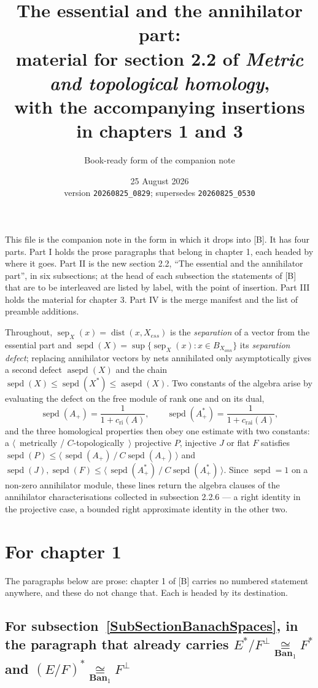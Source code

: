 \documentclass[11pt]{article}
\title{The essential and the annihilator part:\\
material for section 2.2 of \emph{Metric and topological homology},\\
with the accompanying insertions in chapters 1 and 3}
\author{Book-ready form of the companion note}
\date{25 August 2026 \\[2pt] {\small version \texttt{20260825\_0829};
supersedes \texttt{20260825\_0530}}}
\theoremstyle{plain}
\theoremstyle{definition}
\newcommand{\isom}[1]{\mathrel{\mathop{\cong}\limits_{#1}}}
\DeclareMathOperator{\dist}{dist}
\DeclareMathOperator{\sep}{sep}
\DeclareMathOperator{\sepd}{sepd}
\DeclareMathOperator{\asepd}{asepd}
\newcommand{\cri}{c_{\mathrm{ri}}}
\newcommand{\crai}{c_{\mathrm{rai}}}
\begin{document}
\maketitle

\noindent
This file is the companion note in the form in which it drops into [B]. It has
four parts. Part I holds the prose paragraphs that belong in chapter 1, each
headed by where it goes. Part II is the new section 2.2, ``The essential and the
annihilator part'', in six subsections; at the head of each subsection the
statements of [B] that are to be interleaved are listed by label, with the point
of insertion. Part III holds the material for chapter 3. Part IV is the merge
manifest and the list of preamble additions.

Throughout, $\sep_X(x)=\dist(x,X_{ess})$ is the \emph{separation} of a vector
from the essential part and
$\sepd(X)=\sup\{\sep_X(x):x\in B_{X_{ann}}\}$ its \emph{separation defect};
replacing annihilator vectors by nets annihilated only asymptotically gives a
second defect $\asepd(X)$ and the chain $\sepd(X)\leq\sepd(X^*)\leq\asepd(X)$.
Two constants of the algebra arise by evaluating the defect on the free module
of rank one and on its dual,
\[
\sepd(A_+)=\frac{1}{1+\cri(A)},
\qquad
\sepd(A_+^*)=\frac{1}{1+\crai(A)},
\]
and the three homological properties then obey one estimate with two constants:
a $\langle$~metrically / $C$-topologically~$\rangle$ projective $P$, injective
$J$ or flat $F$ satisfies
$\sepd(P)\leq\langle\,\sepd(A_+)\ /\ C\sepd(A_+)\,\rangle$ and
$\sepd(J),\sepd(F)\leq\langle\,\sepd(A_+^*)\ /\ C\sepd(A_+^*)\,\rangle$.
Since $\sepd=1$ on a non-zero annihilator module, these lines return the algebra
clauses of the annihilator characterisations collected in subsection 2.2.6 --- a
right identity in the projective case, a bounded right approximate identity in
the other two.

\section{For chapter 1}\label{PartI}

The paragraphs below are prose: chapter 1 of [B] carries no numbered statement
anywhere, and these do not change that. Each is headed by its destination.

\subsection{For subsection~\ref{SubSectionBanachSpaces}, in the paragraph that
already carries $E^*/F^\perp\isom{\mathbf{Ban}_1}F^*$ and
${(E/F)}^*\isom{\mathbf{Ban}_1}F^\perp$}
\end{document}
